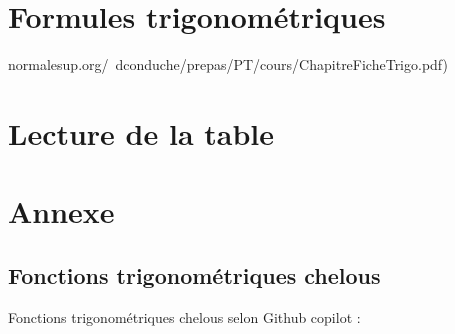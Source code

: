 \documentclass[a4paper]{article}
\begin{document}
	\section{Formules trigonométriques}

		normalesup.org/~dconduche/prepas/PT/cours/ChapitreFicheTrigo.pdf)

	\section{Lecture de la table}

	\section{Annexe}

		\subsection*{Fonctions trigonométriques chelous} \label{fonction_trigo_chelous}

		Fonctions trigonométriques chelous selon Github copilot :
\end{document}
